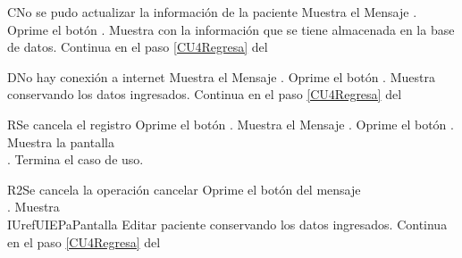 \begin{UCtrayectoriaA}{C}{No se pudo actualizar la información de la paciente}
    \UCpaso Muestra el Mensaje \textbf{}.
    \UCpaso[\UCactor] Oprime el botón .
    \UCpaso Muestra  con la información que se tiene almacenada en la base de datos.
    \UCpaso Continua en el paso \ref{CU4Regresa} del 
\end{UCtrayectoriaA}

\begin{UCtrayectoriaA}{D}{No hay conexión a internet}
    \UCpaso Muestra el Mensaje \textbf{}.
    \UCpaso[\UCactor] Oprime el botón .
    \UCpaso Muestra  conservando los datos ingresados.
    \UCpaso Continua en el paso \ref{CU4Regresa} del 
\end{UCtrayectoriaA}

\begin{UCtrayectoriaA}{R}{Se cancela el registro}
	\UCpaso[\UCactor] Oprime el botón .
	\UCpaso Muestra el Mensaje \textbf{}.
    \UCpaso[\UCactor] Oprime el botón . 
	\UCpaso Muestra la pantalla \\.
	\UCpaso Termina el caso de uso.
\end{UCtrayectoriaA}

\begin{UCtrayectoriaA}{R2}{Se cancela la operación cancelar}
    \UCpaso[\UCactor] Oprime el botón  del mensaje
        \\\textbf{}.
    \UCpaso Muestra \\IUref{UIEPa}{Pantalla Editar paciente} conservando los datos ingresados.
    \UCpaso Continua en el paso \ref{CU4Regresa} del 
\end{UCtrayectoriaA}

